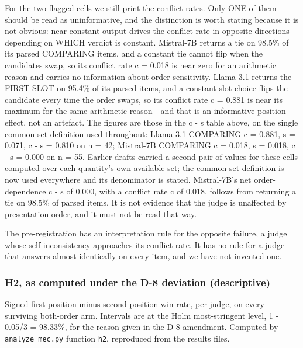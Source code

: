 For the two flagged cells we still print the conflict rates. Only ONE of them should be read as
uninformative, and the distinction is worth stating because it is not obvious: near-constant output
drives the conflict rate in opposite directions depending on WHICH verdict is constant. Mistral-7B
returns a tie on 98.5\% of its parsed COMPARING items, and a constant tie cannot flip when the
candidates swap, so its conflict rate c = 0.018 is near zero for an arithmetic reason and carries no
information about order sensitivity. Llama-3.1 returns the FIRST SLOT on 95.4\% of its parsed items,
and a constant slot choice flips the candidate every time the order swaps, so its conflict rate
c = 0.881 is near its maximum for the same arithmetic reason - and that is an informative position
effect, not an artefact. The figures are those in the c - s table above,
on the single common-set definition used throughout: Llama-3.1 COMPARING c = 0.881, s = 0.071,
c - s = 0.810 on n = 42; Mistral-7B COMPARING c = 0.018, s = 0.018, c - s = 0.000 on n = 55.
Earlier drafts carried a second pair of values for these cells computed over each quantity's own
available set; the common-set definition is now used everywhere and its denominator is stated. Mistral-7B's net order-dependence c - s of 0.000, with a conflict rate c of 0.018, follows from
returning a tie on 98.5\% of parsed items. It is not evidence that the judge is
unaffected by presentation order, and it must not be read that way.

The pre-registration has an interpretation rule for the opposite failure, a judge whose
self-inconsistency approaches its conflict rate. It has no rule for a judge that answers almost
identically on every item, and we have not invented one.

\subsubsection{H2, as computed under the D-8 deviation (descriptive)}\label{h2-as-computed-under-the-d-8-deviation-descriptive}

Signed first-position minus second-position win rate, per judge, on every surviving both-order arm.
Intervals are at the Holm most-stringent level, 1 - 0.05/3 = 98.33\%, for the reason given in the
D-8 amendment. Computed by \texttt{analyze\_mec.py} function \texttt{h2}, reproduced from the results files.

